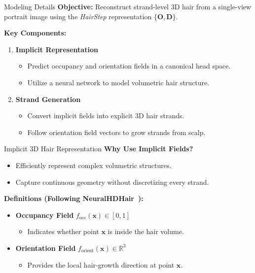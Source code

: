 \begin{frame}[t]{Modeling Details}
    \textbf{Objective:} Reconstruct strand-level 3D hair from a single-view portrait image using the \emph{HairStep} representation $\{\mathbf{O}, \mathbf{D}\}$.

    \vspace{5pt}

    \textbf{Key Components:}
    \begin{enumerate}
        \item \textbf{Implicit Representation}
        \begin{itemize}
            \item Predict occupancy and orientation fields in a canonical head space.
            \item Utilize a neural network to model volumetric hair structure.
        \end{itemize}
        \item \textbf{Strand Generation}
        \begin{itemize}
            \item Convert implicit fields into explicit 3D hair strands.
            \item Follow orientation field vectors to grow strands from scalp.
        \end{itemize}
    \end{enumerate}
\end{frame}

\begin{frame}[t]{Implicit 3D Hair Representation}
    \textbf{Why Use Implicit Fields?}
    \begin{itemize}
        \item Efficiently represent complex volumetric structures.
        \item Capture continuous geometry without discretizing every strand.
    \end{itemize}

    \vspace{5pt}

    \textbf{Definitions (Following NeuralHDHair~\cite{wu2022neuralhdhair}):}
    \begin{itemize}
        \item \textbf{Occupancy Field} $f_{\text{occ}}(\mathbf{x}) \in [0,1]$
        \begin{itemize}
            \item Indicates whether point $\mathbf{x}$ is inside the hair volume.
        \end{itemize}
        \item \textbf{Orientation Field} $f_{\text{orient}}(\mathbf{x}) \in \mathbb{R}^3$
        \begin{itemize}
            \item Provides the local hair-growth direction at point $\mathbf{x}$.
        \end{itemize}
    \end{itemize}
\end{frame}

